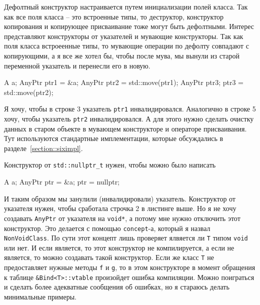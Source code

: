Дефолтный конструктор настраивается путем инициализации полей класса.
Так как все поля класса -- это встроенные типы, то деструктор, конструктор копирования и копирующее присваивание тоже могут быть дефолтными.
Интерес представляют конструкторы от указателей и мувающие конструкторы.
Так как поля класса встроеенные типы, то мувающие операции по дефолту совпадают с копирующими, а я все же хотел бы, чтобы после мува, мы вынули из старой переменной указатель и перенесли его в новую.
\begin{cppcode}
A a;
AnyPtr ptr1 = &a;
AnyPtr ptr2 = std::move(ptr1);
AnyPtr ptr3;
ptr3 = std::move(ptr2);
\end{cppcode}
Я хочу, чтобы в строке 3 указатель \texttt{ptr1} инвалидировался.
Аналогично в строке 5 хочу, чтобы указатель \texttt{ptr2} инвалидировался.
А для этого нужно сделать очистку данных в старом объекте в мувающем конструкторе и операторе присваивания.
Тут используются стандартные имплементации, которые обсуждались в разделе~\ref{section::siximpl}.

Конструктор от \texttt{std::nullptr\_t} нужен, чтобы можно было написать
\begin{cppcode}
A a;
AnyPtr ptr = &a;
ptr = nullptr;
\end{cppcode}
И таким образом мы  занулили (инвалидировали) указатель.
Конструктор от указателя нужен, чтобы сработала строчка 2 в листинге выше.
Но я не хочу создавать \texttt{AnyPtr} от указателя на \texttt{void*}, а потому мне нужно отключить этот конструктор.
Это делается с помощью \texttt{concept}-а, который я назвал \texttt{NonVoidClass}.
По сути этот концепт лишь проверяет ялвяется ли \texttt{T} типом \texttt{void} или нет.
И если является, то этот конструктор не компилируется, а если не является, то можно создавать такой конструктор.
Если же класс \texttt{T} не предоставляет нужные методы \texttt{f} и \texttt{g}, то в этом конструкторе в момент обращения к таблице \texttt{\&Bind<T>::vtable} произойдет ошибка компиляции.
Можно поиграться и сделать более адекватные сообщения об ошибках, но я стараюсь делать минимальные примеры.

